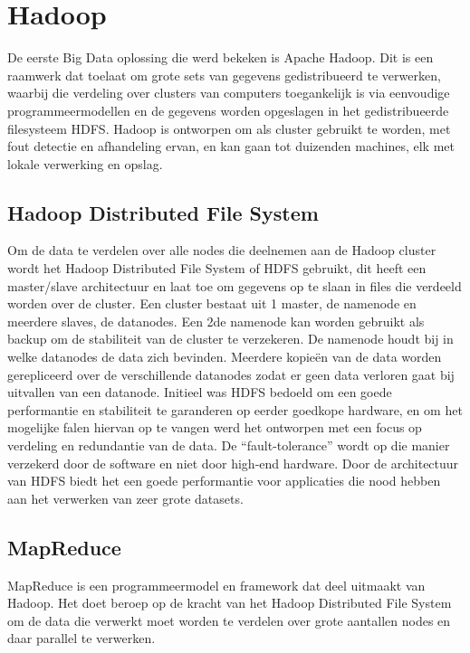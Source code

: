 \section{Hadoop}
De eerste Big Data oplossing die werd bekeken is Apache Hadoop. Dit is een raamwerk dat toelaat om grote sets van gegevens gedistribueerd te verwerken, waarbij die verdeling over clusters van computers toegankelijk is via eenvoudige programmeermodellen en de gegevens worden opgeslagen in het gedistribueerde filesysteem HDFS.
\newline
Hadoop is ontworpen om als cluster gebruikt te worden, met fout detectie en afhandeling ervan, en kan gaan tot duizenden machines, elk met lokale verwerking en opslag. \autocite{ASF2022}

\subsection{Hadoop Distributed File System}
Om de data te verdelen over alle nodes die deelnemen aan de Hadoop cluster wordt het Hadoop Distributed File System of HDFS gebruikt, dit heeft een \newline master/slave architectuur en laat toe om gegevens op te slaan in files die verdeeld worden over de cluster. Een cluster bestaat uit 1 master, de namenode en meerdere slaves, de datanodes. Een 2de namenode kan worden gebruikt als backup om de stabiliteit van de cluster te verzekeren.
\newline
De namenode houdt bij in welke datanodes de data zich bevinden. Meerdere kopieën van de data worden gerepliceerd over de verschillende datanodes zodat er geen data verloren gaat bij uitvallen van een datanode.
\newline
\newline
Initieel was HDFS bedoeld om een goede performantie en stabiliteit te garanderen op eerder goedkope hardware, en om het mogelijke falen hiervan op te vangen werd het ontworpen met een focus op verdeling en redundantie van de data. De ``fault-tolerance'' wordt op die manier verzekerd door de software en niet door high-end hardware.
Door de architectuur van HDFS biedt het een goede performantie voor applicaties die nood hebben aan het verwerken van zeer grote datasets.\autocite{Borthakur2007}
\newline
\newline
\subsection{MapReduce}
MapReduce is een programmeermodel en framework dat deel uitmaakt van Hadoop. Het doet beroep op de kracht van het Hadoop Distributed File System om de data die verwerkt moet worden te verdelen over grote aantallen nodes en daar parallel te verwerken.\autocite{Talend2023}

